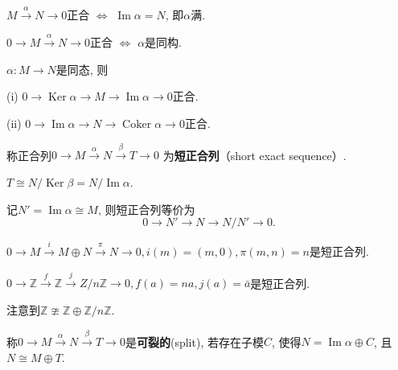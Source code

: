 \begin{example}
    $M \xrightarrow{\alpha} N\rightarrow 0$正合 $\iff$ $\operatorname{Im}\alpha=N$, 即$\alpha$满.\par
\end{example} 

\begin{example}
    $0\rightarrow M \xrightarrow{\alpha} N\rightarrow 0$正合 $\iff$ $\alpha$是同构.\par
\end{example}

\begin{example}
    $\alpha:M\rightarrow N$是同态, 则\par
    \qquad (i) $0\rightarrow \operatorname{Ker}\alpha 
    \rightarrow M \rightarrow \operatorname{Im}\alpha \rightarrow 0$正合.\par
    \qquad (ii) $0\rightarrow \operatorname{Im}\alpha 
    \rightarrow N \rightarrow \operatorname{Coker}\alpha \rightarrow 0$正合.
\end{example}

\begin{definition}
    称正合列$0\rightarrow M \xrightarrow{\alpha} N \xrightarrow{\beta} T \rightarrow 0$
    为\textbf{短正合列}（short exact sequence）.
\end{definition}

\begin{proposition}
    $T\cong N/\operatorname{Ker} \beta =N/ \operatorname{Im} \alpha$.\par
    \qquad  记$N'=\operatorname{Im} \alpha \cong M$, 则短正合列等价为
        $$0\rightarrow N' \rightarrow N \rightarrow N/N' \rightarrow 0.$$
\end{proposition}

\begin{example}
    $0\rightarrow M \xrightarrow{i} M\oplus N \xrightarrow{\pi} N \rightarrow 0,
    i(m)=(m,0),\pi(m,n)=n$是短正合列.
\end{example}


\begin{example}
    $0\rightarrow \mathbb{Z} \xrightarrow{f} \mathbb{Z} \xrightarrow{j} Z/n\mathbb{Z} \rightarrow 0,
    f(a)=na,j(a)=\bar{a}$是短正合列.\par
    注意到$\mathbb{Z}\ncong \mathbb{Z}\oplus \mathbb{Z}/n \mathbb{Z}$.
\end{example}

\begin{definition}
    称$0\rightarrow M \xrightarrow{\alpha} N \xrightarrow{\beta} T \rightarrow 0$是\textbf{可裂的}(split), 若存在子模$C$, 
使得$N=\operatorname{Im} \alpha \oplus C$, 且$N\cong M\oplus T$.
\end{definition}

